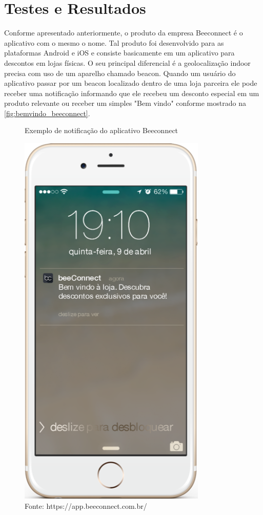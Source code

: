 \chapter{Testes e Resultados}
\label{cha:testes_e_resultados}
Conforme apresentado anteriormente, o produto da empresa Beeconnect é o aplicativo com o mesmo o nome. Tal produto foi desenvolvido para as plataformas Android e iOS e consiste basicamente em um aplicativo para descontos em lojas físicas. O seu principal diferencial é a geolocalização indoor precisa com uso de um aparelho chamado beacon. Quando um usuário do aplicativo passar por um beacon localizado dentro de uma loja parceira ele pode receber uma notificação informando que ele recebeu um desconto especial em um produto relevante ou receber um simples "Bem vindo" conforme mostrado na \autoref{fig:bemvindo_beeconnect}.

\begin{figure}[H]
\caption{Exemplo de notificação do aplicativo Beeconnect}
\centerline{\includegraphics[scale=0.35]{img/bemvindo_beeconnect}}
\label{fig:bemvindo_beeconnect}
\caption* {Fonte: https://app.beeconnect.com.br/}
\end{figure}

